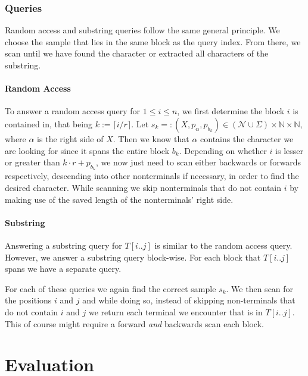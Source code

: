 \documentclass{scrartcl}
\begin{document}
\subsubsection{Queries}

Random access and substring queries follow the same general principle.
We choose the sample that lies in the same block as the query index.
From there, we scan until we have found the character or extracted all characters of the substring.

\paragraph{Random Access}

To answer a random access query for $1 \leq i \leq n$, we first determine the block $i$ is contained in, that being $k := \lceil i/r \rceil$.
Let $s_k =: (X, p_{\alpha}, p_{b_k}) \in (\mathcal{N} \cup \Sigma) \times \mathbb{N} \times \mathbb{N}$, where $\alpha$ is the right side of $X$.
Then we know that $\alpha$ contains the character we are looking for since it spans the entire block $b_k$.
Depending on whether $i$ is lesser or greater than $k \cdot r + p_{b_k}$, we now just need to scan either backwards or forwards respectively,
descending into other nonterminals if necessary, in order to find the desired character.
While scanning we skip nonterminals that do not contain $i$ by making use of the saved length of the nonterminals' right side.

\paragraph{Substring}

Answering a substring query for $T[i..j]$ is similar to the random access query.
However, we answer a substring query block-wise. For each block that $T[i..j]$ spans we have a separate query.

For each of these queries we again find the correct sample $s_k$.
We then scan for the positions $i$ and $j$ and while doing so, instead of skipping non-terminals that do not contain $i$ and $j$
we return each terminal we encounter that is in $T[i..j]$.
This of course might require a forward \emph{and} backwards scan each block.

\section{Evaluation}

\end{document}

